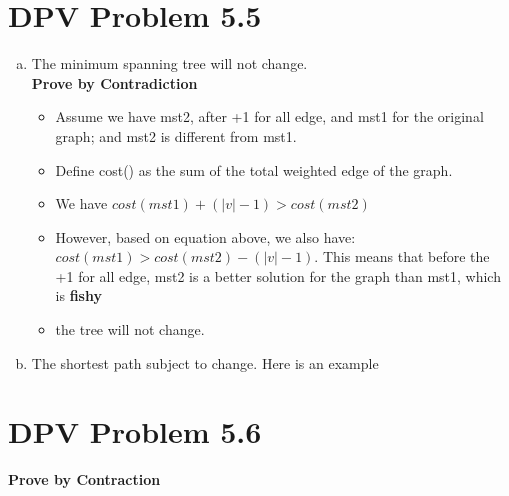 \documentclass{article}
\begin{document}
\section{DPV Problem 5.5}
\begin{enumerate}[a)]
    \item The minimum spanning tree will not change. \\
        \textbf{Prove by Contradiction}
        \begin{itemize}
            \item Assume we have mst2, after +1 for all edge, and mst1 for the original graph; and mst2 is different from  mst1.
            \item Define cost() as the sum of the total weighted edge of the graph.
            \item We have $cost(mst1) + (|v| - 1) > cost(mst2)$ 
            \item However, based on equation above, we also have: $cost(mst1) > cost(mst2) - (|v| - 1)$. This means that before the +1 for all edge, mst2 is a better solution for the graph than mst1, which is \textbf{fishy}
            \item the tree will not change.
        \end{itemize}
    \item The shortest path subject to change. Here is an example \\
\end{enumerate}

\section{DPV Problem 5.6}
\textbf{Prove by Contraction}
\end{document}
